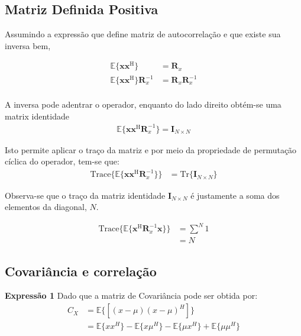 \subsection{Matriz Definida Positiva} %

Assumindo a expressão que define matriz de autocorrelação e que existe sua inversa bem, 

\begin{align*}
    \mathbb{E}\{\mathbf{x} \mathbf{x}^{\text{H}}\} &= \mathbf{R}_{x} \\
    \mathbb{E}\{\mathbf{x} \mathbf{x}^{\text{H}}\}\mathbf{R}^{-1}_{x} &= \mathbf{R}_{x}\mathbf{R}^{-1}_{x} \\
\end{align*}

A inversa pode adentrar o operador, enquanto do lado direito obtém-se uma matrix identidade
\begin{align*}
    \mathbb{E}\{\mathbf{x} \mathbf{x}^{\text{H}}\mathbf{R}^{-1}_{x}\} = \mathbf{I}_{N \times N}
\end{align*}

Isto permite aplicar o traço da matriz e por meio da propriedade de permutação cíclica do operador, tem-se que:
\begin{align*}
    \text{Trace}\{\mathbb{E}\{\mathbf{x} \mathbf{x}^{\text{H}}\mathbf{R}^{-1}_{x}\}\} &= \text{Tr}\{\mathbf{I}_{N \times N}\} 
\end{align*}

Observa-se que o traço da matriz identidade $\mathbf{I}_{N \times N}$ é justamente a soma dos elementos da diagonal, $N$.

\begin{align*}
    \text{Trace}\{\mathbb{E}\{\mathbf{x}^{\text{H}}\mathbf{R}^{-1}_{x} \mathbf{x}\}\} &= \sum^{N} 1 \\
    &= N
\end{align*}


\subsection{Covariância e correlação} %

\textbf{Expressão 1}
Dado que a matriz de Covariância pode ser obtida por:
\begin{align*}
    C_{X} &= \mathbb{E}\{[(x - \mu)(x - \mu)^{H}]\} \\
    &= \mathbb{E}\{xx^{H}\} -\mathbb{E}\{x\mu^{H}\} - \mathbb{E}\{\mu x^{H}\} + \mathbb{E}\{\mu \mu^{H}\}
\end{align*}

